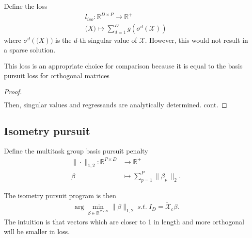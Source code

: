 \documentclass[a4paper,11pt]{article}
\begin{document}
Define the loss
\begin{align}
l_{iso}: \mathbb R^{D \times P} \to \mathbb R^{+} \\
\mathcal (X) \mapsto \sum_{d = 1}^D g(\sigma^d(\mathcal X))
\end{align}
where $\sigma^d (\mathcal (X))$ is the $d$-th singular value of $\mathcal X$.
However, this would not result in a sparse solution.

This loss is an appropriate choice for comparison because it is equal to the basis pursuit loss for orthogonal matrices
\begin{proposition}
\label{prop:main}
\end{proposition}
\begin{proof}
\begin{align}
\end{align}
Then, singular values and regressands are analytically determined.  cont.
\end{proof}

\subsection{Isometry pursuit}

Define the multitask group basis pursuit penalty %
\begin{align}
\label{eq:bp}
\| \cdot \|_{1,2}: \mathbb R^{P \times D} &\to \mathbb R^+ \\ 
\beta &\mapsto  \sum_{p=1}^P  \|\beta_{p.}\|_2.
\end{align}

The isometry pursuit program is then
\begin{align}
\label{prog:ip}
\arg \min_{\beta \in \mathbb R^{P \times D}} \| \beta \|_{1,2} \; s.t. \; I_D = \tilde{ \mathcal X}_c \beta.
\end{align}
The intuition is that vectors which are closer to 1 in length and more orthogonal will be smaller in loss.


\end{document}
